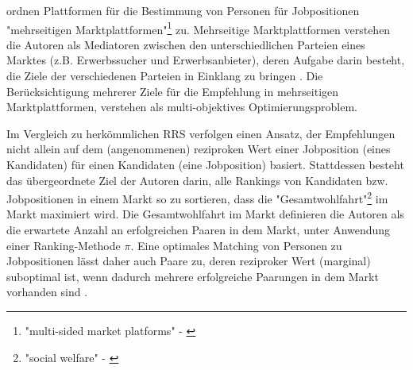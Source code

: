 

\textcite[S. 329]{su:inproceedings} ordnen Plattformen für die Bestimmung von Personen für Jobpositionen "mehrseitigen Marktplattformen"\footnote{"multi-sided market platforms" - \textcite[S. 329]{su:inproceedings}} zu.
Mehrseitige Marktplattformen verstehen die Autoren als Mediatoren zwischen den unterschiedlichen Parteien eines Marktes (z.B. Erwerbssucher und Erwerbsanbieter), deren Aufgabe darin besteht, die Ziele der verschiedenen Parteien in Einklang zu bringen \cite[S. 329]{su:inproceedings}.
Die Berücksichtigung mehrerer Ziele für die Empfehlung in mehrseitigen Marktplattformen, verstehen \textcite[S. 329]{su:inproceedings} als multi-objektives Optimierungsproblem.

Im Vergleich zu herkömmlichen \ac{RRS} verfolgen \textcite[S. 328ff.]{su:inproceedings} einen Ansatz, der Empfehlungen nicht allein auf dem (angenommenen) reziproken Wert einer Jobposition (eines Kandidaten) für einen Kandidaten (eine Jobposition) basiert.
Stattdessen besteht das übergeordnete Ziel der Autoren darin, alle Rankings von Kandidaten bzw. Jobpositionen in einem Markt so zu sortieren, dass die "Gesamtwohlfahrt"\footnote{"social welfare" - \textcite[S. 329]{su:inproceedings}} im Markt maximiert wird.
Die Gesamtwohlfahrt im Markt definieren die Autoren als die erwartete Anzahl an erfolgreichen Paaren in dem Markt, unter Anwendung einer Ranking-Methode $\pi$.
Eine optimales Matching von Personen zu Jobpositionen lässt daher auch Paare zu, deren reziproker Wert (marginal) suboptimal ist, wenn dadurch mehrere erfolgreiche Paarungen in dem Markt vorhanden sind \cite[S. 334]{su:inproceedings}.

